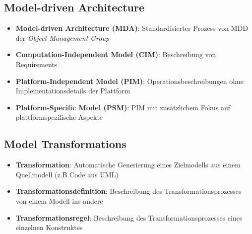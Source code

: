 \subsection{Model-driven Architecture}
\label{mdd:sub:model_driven_architecture}

\begin{itemize}
	\item \textbf{Model-driven Architecture (MDA)}: Standardisierter Prozess von MDD der \textit{Object Management Group}
	\item \textbf{Computation-Independent Model (CIM)}: Beschreibung von Requirements
	\item \textbf{Platform-Independent Model (PIM)}: Operationsbeschreibungen ohne Implementationsdetails der Plattform
	\item \textbf{Platform-Specific Model (PSM)}: PIM mit zusätzlichem Fokus auf plattformspezifische Aspekte
\end{itemize}

\subsection{Model Transformations}
\label{mdd:sub:model_transformations}

\begin{itemize}
	\item \textbf{Transformation}: Automatische Generierung eines Zielmodells aus einem Quellmodell (z.B Code aus UML)
	\item \textbf{Transformationsdefinition}: Beschreibung des Transformationsprozesses von einem Modell ins andere
	\item \textbf{Transformationsregel}: Beschreibung des Transformationsprozesses eines einzelnen Konstruktes
\end{itemize}